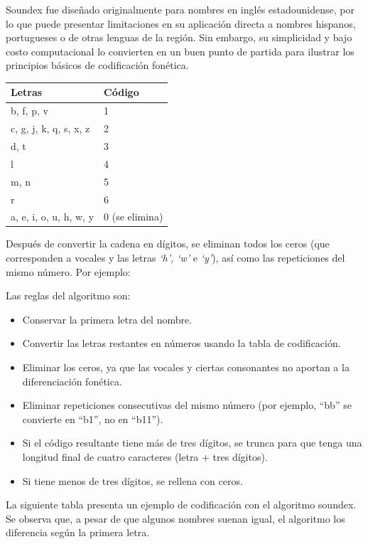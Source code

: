 \documentclass[
  12pt,
]{book}
\providecommand{\tightlist}{%
  \setlength{\itemsep}{0pt}\setlength{\parskip}{0pt}}
\begin{document}
Soundex fue diseñado originalmente para nombres en inglés estadounidense, por lo que puede presentar limitaciones en su aplicación directa a nombres hispanos, portugueses o de otras lenguas de la región. Sin embargo, su simplicidad y bajo costo computacional lo convierten en un buen punto de partida para ilustrar los principios básicos de codificación fonética.

\begin{longtable}[]{@{}ll@{}}
\toprule\noalign{}
Letras & Código \\
\midrule\noalign{}
\endhead
\bottomrule\noalign{}
\endlastfoot
b, f, p, v & 1 \\
c, g, j, k, q, s, x, z & 2 \\
d, t & 3 \\
l & 4 \\
m, n & 5 \\
r & 6 \\
a, e, i, o, u, h, w, y & 0 (se elimina) \\
\end{longtable}

Después de convertir la cadena en dígitos, se eliminan todos los ceros (que corresponden a vocales y las letras \emph{`h', `w'} e \emph{`y'}), así como las repeticiones del mismo número. Por ejemplo:

Las reglas del algoritmo son:

\begin{itemize}
\tightlist
\item
  Conservar la primera letra del nombre.
\item
  Convertir las letras restantes en números usando la tabla de codificación.
\item
  Eliminar los ceros, ya que las vocales y ciertas consonantes no aportan a la diferenciación fonética.
\item
  Eliminar repeticiones consecutivas del mismo número (por ejemplo, ``bb'' se convierte en ``b1'', no en ``b11'').
\item
  Si el código resultante tiene más de tres dígitos, se trunca para que tenga una longitud final de cuatro caracteres (letra + tres dígitos).
\item
  Si tiene menos de tres dígitos, se rellena con ceros.
\end{itemize}

La siguiente tabla presenta un ejemplo de codificación con el algoritmo soundex. Se observa que, a pesar de que algunos nombres suenan igual, el algoritmo los diferencia según la primera letra.
\end{document}
